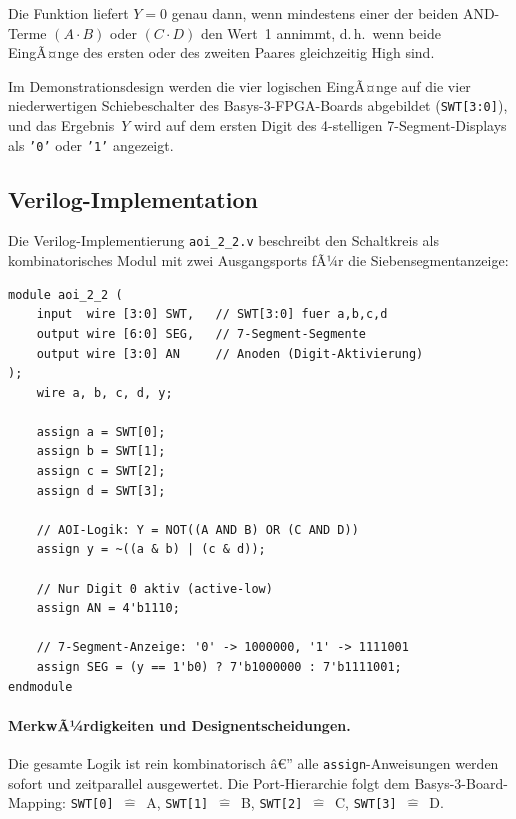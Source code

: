 ﻿\documentclass[12pt,a4paper]{report}
\begin{document}
Die Funktion liefert $Y = 0$ genau dann, wenn mindestens einer der beiden
AND-Terme $(A \cdot B)$ oder $(C \cdot D)$ den Wert~1 annimmt, d.\,h.\ wenn
beide EingÃ¤nge des ersten oder des zweiten Paares gleichzeitig High sind.

Im Demonstrationsdesign werden die vier logischen EingÃ¤nge auf die vier
niederwertigen Schiebeschalter des Basys-3-FPGA-Boards abgebildet
(\texttt{SWT[3:0]}), und das Ergebnis~$Y$ wird auf dem ersten Digit des
4-stelligen 7-Segment-Displays als \texttt{'0'} oder \texttt{'1'} angezeigt.

\subsection{Verilog-Implementation}
\label{sssec:aoi_verilog}

Die Verilog-Implementierung \texttt{aoi\_2\_2.v} beschreibt den Schaltkreis
als kombinatorisches Modul mit zwei Ausgangsports fÃ¼r die Siebensegmentanzeige:

\begin{lstlisting}[style=hdlstyle, caption={Verilog-Implementation des AOI-2-2-Schaltkreises (\texttt{aoi\_2\_2.v})}]
module aoi_2_2 (
    input  wire [3:0] SWT,   // SWT[3:0] fuer a,b,c,d
    output wire [6:0] SEG,   // 7-Segment-Segmente
    output wire [3:0] AN     // Anoden (Digit-Aktivierung)
);
    wire a, b, c, d, y;

    assign a = SWT[0];
    assign b = SWT[1];
    assign c = SWT[2];
    assign d = SWT[3];

    // AOI-Logik: Y = NOT((A AND B) OR (C AND D))
    assign y = ~((a & b) | (c & d));

    // Nur Digit 0 aktiv (active-low)
    assign AN = 4'b1110;

    // 7-Segment-Anzeige: '0' -> 1000000, '1' -> 1111001
    assign SEG = (y == 1'b0) ? 7'b1000000 : 7'b1111001;
endmodule
\end{lstlisting}

\paragraph{MerkwÃ¼rdigkeiten und Designentscheidungen.}
Die gesamte Logik ist rein kombinatorisch â€” alle \texttt{assign}-Anweisungen
werden sofort und zeitparallel ausgewertet. Die Port-Hierarchie folgt dem
Basys-3-Board-Mapping: \texttt{SWT[0]}~$\widehat{=}$~A, \texttt{SWT[1]}~$\widehat{=}$~B,
\texttt{SWT[2]}~$\widehat{=}$~C, \texttt{SWT[3]}~$\widehat{=}$~D.
\end{document}
